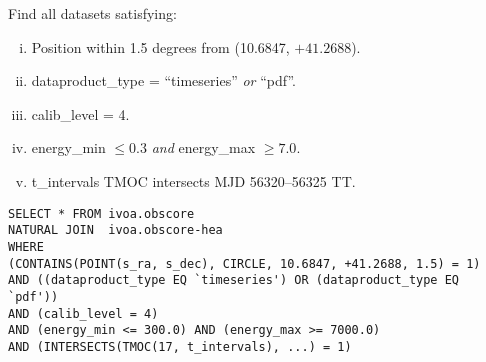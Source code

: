 \medskip
\noindent Find all datasets satisfying:
\begin{enumerate}[(i)]
  \item Position within 1.5 degrees from (10.6847, $+41.2688$).
  \item dataproduct\_type = ``timeseries'' {\em or\/} ``pdf''.
  \item calib\_level = 4.
  \item energy\_min $\leq 0.3$ {\em and\/} energy\_max $\geq 7.0$.
  \item t\_intervals TMOC intersects MJD 56320--56325 TT.
\end{enumerate}


\begin{verbatim}
SELECT * FROM ivoa.obscore
NATURAL JOIN  ivoa.obscore-hea 
WHERE
(CONTAINS(POINT(s_ra, s_dec), CIRCLE, 10.6847, +41.2688, 1.5) = 1) 
AND ((dataproduct_type EQ `timeseries') OR (dataproduct_type EQ `pdf'))
AND (calib_level = 4)
AND (energy_min <= 300.0) AND (energy_max >= 7000.0)
AND (INTERSECTS(TMOC(17, t_intervals), ...) = 1)
\end{verbatim}
